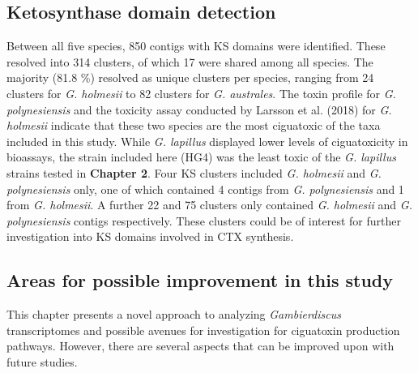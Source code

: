 \documentclass[12pt]{article}
\begin{document}
\subsection{Ketosynthase domain detection}
Between all five species, 850 contigs with KS domains were identified. 
These resolved into 314 clusters, of which 17 were shared among all species. 
The majority (81.8 \%) resolved as unique clusters per species, ranging from 24 clusters for \textit{G. holmesii} to 82 clusters for \textit{G. australes}. 
The toxin profile for \textit{G. polynesiensis} and the toxicity assay conducted by Larsson et al. (2018) for \textit{G. holmesii} indicate that these two species are the most ciguatoxic of the taxa included in this study. 
While \textit{G. lapillus} displayed lower levels of ciguatoxicity in bioassays, the strain included here (HG4) was the least toxic of the \textit{G. lapillus} strains tested in \textbf{Chapter 2}. %
Four KS clusters included \textit{G. holmesii} and \textit{G. polynesiensis} only, one of which contained 4 contigs from \textit{G. polynesiensis} and 1 from \textit{G. holmesii}. 
A further 22 and 75 clusters only contained \textit{G. holmesii} and \textit{G. polynesiensis} contigs respectively. 
These clusters                                                                                                                                                                                                                                                                                                                                                                                                                                                                                                                                                                                                                                                                                                                                                                                                                                                                 could be of interest for further investigation into KS domains involved in CTX synthesis. 


\subsection{Areas for possible improvement in this study}
This chapter presents a novel approach to analyzing \textit{Gambierdiscus} transcriptomes and possible avenues for investigation for ciguatoxin production pathways. 
However, there are several aspects that can be improved upon with future studies.
\end{document}
